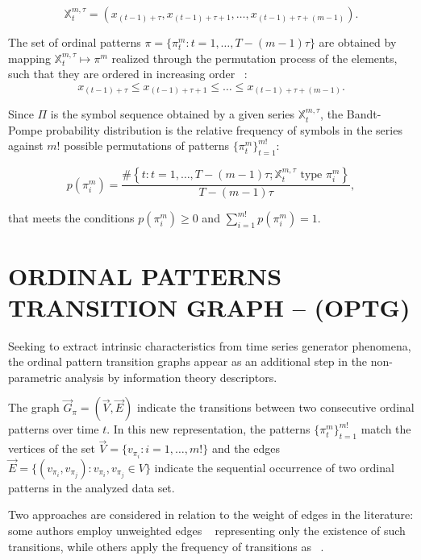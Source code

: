 \documentclass{isprs}
\begin{document}
	\begin{equation}
	\mathbb{X}_t^{m,\tau} = (x_{(t-1)+\tau}, x_{(t-1)+\tau+1},\ldots, x_{(t-1)+\tau+(m-1)}).
	\end{equation}
	
	The set of ordinal patterns $\pi = \{\pi_t^m: t = 1, \dots, T- (m-1) \tau \}$ are obtained by mapping $\mathbb{X}^{m, \tau}_t \mapsto \pi^m$ realized through the permutation process of the elements, such that they are ordered in increasing order ~\citep{Ravetti2014noise}:
	$$x_{(t-1) + \tau} \leq x_{(t-1) + \tau + 1} \leq \ldots \leq x_{(t-1) + \tau + (m-1)}.$$
	
	Since $\Pi$ is the symbol sequence obtained by a given series $\mathbb{X}_t^{m,\tau}$, the Bandt-Pompe probability distribution is the relative frequency of symbols in the series against $m!$ possible permutations of patterns $\{\pi_t^m \}_{t = 1}^{m!}$:
	
	\begin{equation}
	p(\pi_i^m) = \frac{\#\left \{t : t = 1, \dots, T-(m-1)\tau; \mathbb{X}_t^{m,\tau} \text{ type } \pi_i^m\right \}}{T- (m-1)\tau},  
	\end{equation}
	
	that meets the conditions $p(\pi_i^m) \ge 0$ and  $\sum_{i=1}^{m!} p(\pi_i^m) = 1$.
	
	\section{ORDINAL PATTERNS TRANSITION GRAPH -- (OPTG)}\label{OPTG}
	
	Seeking to extract intrinsic characteristics from time series generator phenomena, the ordinal pattern transition graphs appear as an additional step in the non-parametric analysis by information theory descriptors.
	
	The graph $\vec{G}_{\pi} = (\vec{V}, \vec{E})$ indicate the transitions between two consecutive ordinal patterns over time $t$.
	In this new representation, the patterns $\{\pi_t^m \}_{t = 1}^{m!}$ match the vertices of the set $\vec{V} = \{v_{\pi_i}: i = 1, \dots, m! \}$ and the edges $\vec{E} = \{(v_{\pi_i}, v_{\pi_j}): v_{\pi_i}, v_{\pi_j} \in V \}$ indicate the sequential occurrence of two ordinal patterns in the analyzed data set.
	
	Two approaches are considered in relation to the weight of edges in the literature: some authors employ unweighted edges ~\citep{McCullough2015lagged, Kulp2016ordinal} representing only the existence of such transitions, while others apply the frequency of transitions as ~\citep{Sorrentino2015periodic, Zhang2017ConstructingOP}.
	
\end{document}
